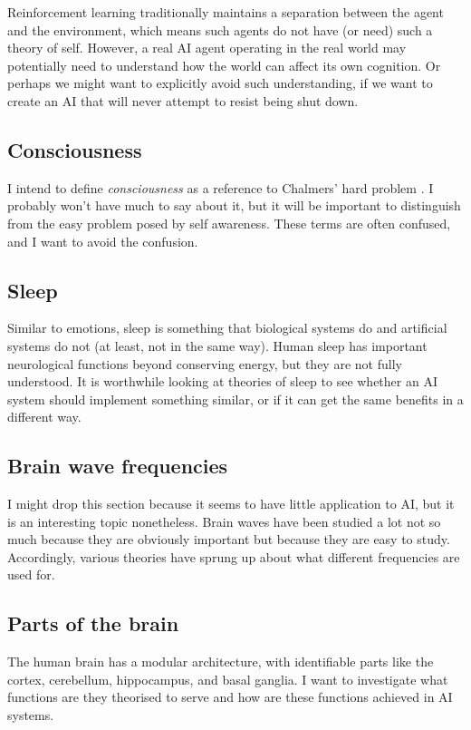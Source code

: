 \documentclass[10pt,a4paper]{article}
\begin{document}
Reinforcement learning traditionally maintains a separation between the agent and the environment, which means such agents do not have (or need) such a theory of self. However, a real AI agent operating in the real world may potentially need to understand how the world can affect its own cognition. Or perhaps we might want to explicitly avoid such understanding, if we want to create an AI that will never attempt to resist being shut down.

\subsection{Consciousness}
I intend to define \emph{consciousness} as a reference to Chalmers' hard problem \cite{chalmers}. I probably won't have much to say about it, but it will be important to distinguish from the easy problem posed by self awareness. These terms are often confused, and I want to avoid the confusion.

\subsection{Sleep}
Similar to emotions, sleep is something that biological systems do and artificial systems do not (at least, not in the same way). Human sleep has important neurological functions beyond conserving energy, but they are not fully understood. It is worthwhile looking at theories of sleep to see whether an AI system should implement something similar, or if it can get the same benefits in a different way.

\subsection{Brain wave frequencies}
I might drop this section because it seems to have little application to AI, but it is an interesting topic nonetheless. Brain waves have been studied a lot not so much because they are obviously important but because they are easy to study. Accordingly, various theories have sprung up about what different frequencies are used for.

\subsection{Parts of the brain}
The human brain has a modular architecture, with identifiable parts like the cortex, cerebellum, hippocampus, and basal ganglia. I want to investigate what functions are they theorised to serve and how are these functions achieved in AI systems.
\end{document}
